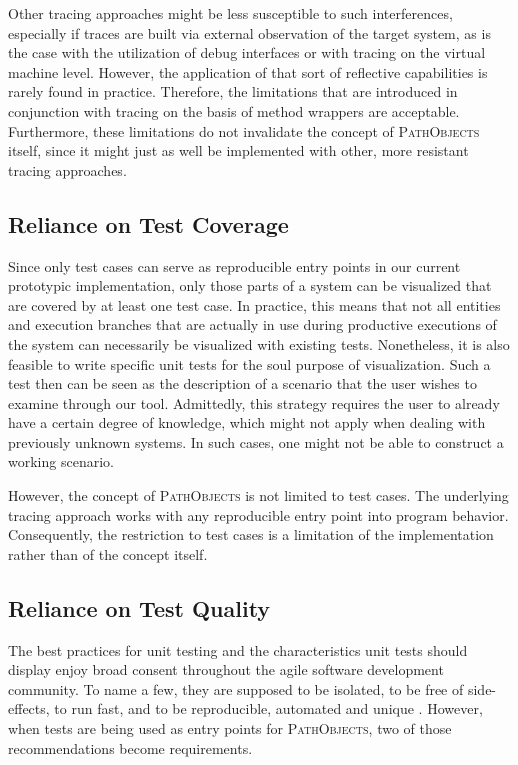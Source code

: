 Other tracing approaches might be less susceptible to such interferences, especially if traces are built via external observation of the target system, as is the case with the utilization of debug interfaces or with tracing on the virtual machine level.
However, the application of that sort of reflective capabilities is rarely found in practice.
Therefore, the limitations that are introduced in conjunction with tracing on the basis of method wrappers are acceptable.
Furthermore, these limitations do not invalidate the concept of \textsc{PathObjects} itself, since it might just as well be implemented with other, more resistant tracing approaches.

\subsection{Reliance on Test Coverage}
\label{ss:DiscussionLimitationsCoverage}
Since only test cases can serve as reproducible entry points in our current prototypic implementation, only those parts of a system can be visualized that are covered by at least one test case.
In practice, this means that not all entities and execution branches that are actually in use during productive executions of the system can necessarily be visualized with existing tests.
Nonetheless, it is also feasible to write specific unit tests for the soul purpose of visualization.
Such a test then can be seen as the description of a scenario that the user wishes to examine through our tool.
Admittedly, this strategy requires the user to already have a certain degree of knowledge, which might not apply when dealing with previously unknown systems.
In such cases, one might not be able to construct a working scenario.

However, the concept of \textsc{PathObjects} is not limited to test cases.
The underlying tracing approach works with any reproducible entry point into program behavior.
Consequently, the restriction to test cases is a limitation of the implementation rather than of the concept itself.

\subsection{Reliance on Test Quality}
\label{ss:DiscussionLimitationsTestQuality}
The best practices for unit testing and the characteristics unit tests should display enjoy broad consent throughout the agile software development community.
To name a few, they are supposed to be isolated, to be free of side-effects, to run fast, and to be reproducible, automated and unique \cite{meszaros_xunit_2006, beck_test_2002}.
However, when tests are being used as entry points for \textsc{PathObjects}, two of those recommendations become requirements.

